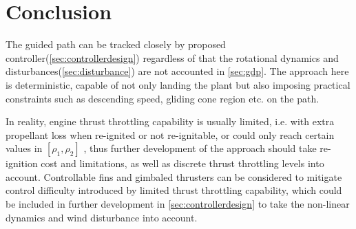 \documentclass[10pt]{elsarticle}
\begin{document}
\section{Conclusion}
The guided path can be tracked closely by proposed controller(\cref{sec:controllerdesign}) regardless of that the rotational dynamics and disturbances(\cref{sec:disturbance}) are not accounted in \cref{sec:gdp}. The approach here is deterministic, capable of not only landing the plant but also imposing practical constraints such as descending speed, gliding cone region etc. on the path.  

In reality, engine thrust throttling capability is usually limited, i.e. with extra propellant loss when re-ignited or not re-ignitable, or could only reach certain values in $[\rho_1, \rho_2]$ \cite{casiano2010liquid,betts2010historical}, thus further development of the approach should take re-ignition cost and limitations, as well as discrete thrust throttling levels into account. Controllable fins and gimbaled thrusters can be considered to mitigate control difficulty introduced by limited thrust throttling capability, which could be included in further development in \cref{sec:controllerdesign} to take the non-linear dynamics and wind disturbance into account.    


 
\end{document}
